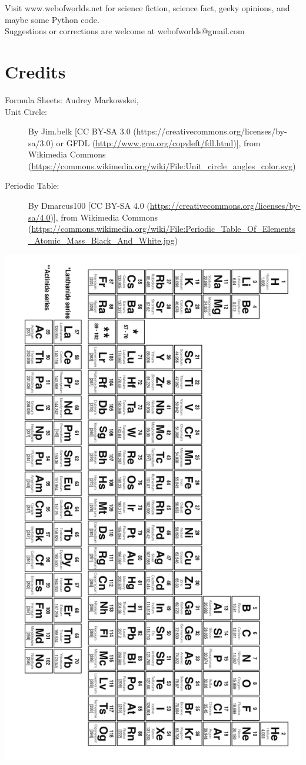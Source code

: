 Visit www.webofworlds.net for science fiction, science fact, geeky opinions, and maybe some Python code. \\ 
Suggestions or corrections are welcome at webofworlds@gmail.com

\section{Credits}

\begin{description}
\item [Formula Sheets: Audrey Markowskei, ] 
\item [Unit Circle:] By Jim.belk [CC BY-SA 3.0 (https://creativecommons.org/licenses/by-sa/3.0) or GFDL (\url{http://www.gnu.org/copyleft/fdl.html})], from Wikimedia Commons (\url{https://commons.wikimedia.org/wiki/File:Unit_circle_angles_color.svg})
\item [Periodic Table:] By Dmarcus100 [CC BY-SA 4.0 (\url{https://creativecommons.org/licenses/by-sa/4.0})], from Wikimedia Commons (\url{https://commons.wikimedia.org/wiki/File:Periodic_Table_Of_Elements_Atomic_Mass_Black_And_White.jpg})
\end{description}

\newpage
\includegraphics[]{figures/Periodic_Table_Of_Elements_Atomic_Mass_Black_And_White.jpg}
\restoregeometry
\newpage
